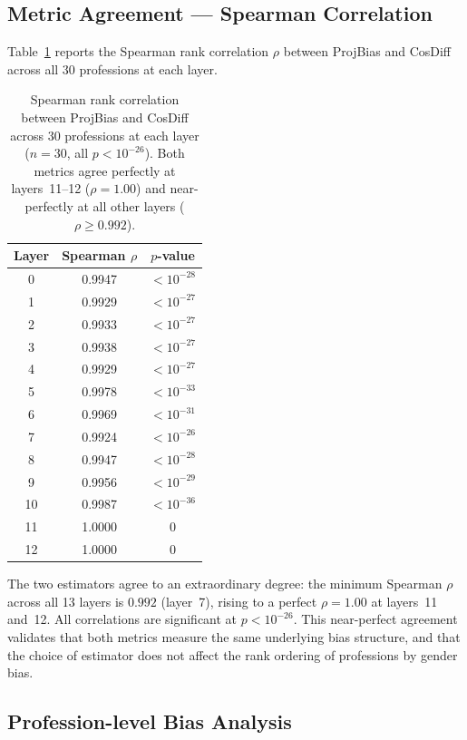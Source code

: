\subsection{Metric Agreement — Spearman Correlation}

Table~\ref{tab:spearman} reports the Spearman rank correlation $\rho$ between
ProjBias and CosDiff across all 30 professions at each layer.

\begin{table}[h]
\centering
\small
\begin{tabular}{ccc}
\toprule
\textbf{Layer} & \textbf{Spearman $\rho$} & \textbf{$p$-value} \\
\midrule
0  & 0.9947 & $< 10^{-28}$ \\
1  & 0.9929 & $< 10^{-27}$ \\
2  & 0.9933 & $< 10^{-27}$ \\
3  & 0.9938 & $< 10^{-27}$ \\
4  & 0.9929 & $< 10^{-27}$ \\
5  & 0.9978 & $< 10^{-33}$ \\
6  & 0.9969 & $< 10^{-31}$ \\
7  & 0.9924 & $< 10^{-26}$ \\
8  & 0.9947 & $< 10^{-28}$ \\
9  & 0.9956 & $< 10^{-29}$ \\
10 & 0.9987 & $< 10^{-36}$ \\
11 & 1.0000 & $0$ \\
12 & 1.0000 & $0$ \\
\bottomrule
\end{tabular}
\caption{Spearman rank correlation between ProjBias and CosDiff across 30
professions at each layer ($n=30$, all $p < 10^{-26}$). Both metrics agree
perfectly at layers~11--12 ($\rho = 1.00$) and near-perfectly at all
other layers ($\rho \geq 0.992$).}
\label{tab:spearman}
\end{table}

The two estimators agree to an extraordinary degree: the minimum Spearman
$\rho$ across all 13 layers is $0.992$ (layer~7), rising to a perfect
$\rho = 1.00$ at layers~11 and~12. All correlations are significant at
$p < 10^{-26}$. This near-perfect agreement validates that both metrics
measure the same underlying bias structure, and that the choice of estimator
does not affect the rank ordering of professions by gender bias.

\subsection{Profession-level Bias Analysis}

